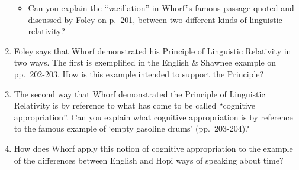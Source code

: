 \documentclass[doc,12pt]{apa6}
\providecommand{\tightlist}{%
  \setlength{\itemsep}{0pt}\setlength{\parskip}{0pt}}
\begin{document}
\begin{enumerate}
  \begin{itemize}
  \tightlist
  \item
    Can you explain the ``vacillation'' in Whorf''s famous passage
    quoted and discussed by Foley on p.~201, between two different kinds
    of linguistic relativity?
  \end{itemize}
\item
  Foley says that Whorf demonstrated his Principle of Linguistic
  Relativity in two ways. The first is exemplified in the English \&
  Shawnee example on pp.~202-203. How is this example intended to
  support the Principle?
\item
  The second way that Whorf demonstrated the Principle of Linguistic
  Relativity is by reference to what has come to be called ``cognitive
  appropriation''. Can you explain what cognitive appropriation is by
  reference to the famous example of `empty gasoline drums'
  (pp.~203-204)?
\item
  How does Whorf apply this notion of cognitive appropriation to the
  example of the differences between English and Hopi ways of speaking
  about time?
\end{enumerate}
\end{document}
